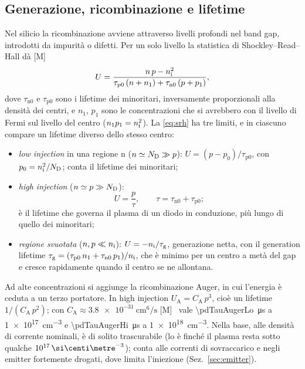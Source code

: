 \documentclass[10pt,a4paper]{scrartcl}
\let\newcommand\pdvaluedefine
\newcommand{\ND}{N_\mathrm{D}}
\newcommand{\nint}{n_\mathrm{i}}
\newcommand{\cmc}{\si{\centi\metre^{-3}}}
\begin{document}
\subsection{Generazione, ricombinazione e lifetime}
\label{sec:lifetime}
Nel silicio la ricombinazione avviene attraverso livelli profondi nel band gap, introdotti da impurità o difetti. Per un solo livello la statistica di Shockley--Read--Hall dà [M]~\cite{sze}
\begin{equation}
U = \frac{n\,p - \nint^2}{\tau_\mathrm{p0}\,(n + n_1) + \tau_\mathrm{n0}\,(p + p_1)} ,
\label{eq:srh}
\end{equation}
dove $\tau_\mathrm{n0}$ e $\tau_\mathrm{p0}$ sono i lifetime dei minoritari, inversamente proporzionali alla densità dei centri, e $n_1$, $p_1$ sono le concentrazioni che si avrebbero con il livello di Fermi sul livello del centro ($n_1 p_1 = \nint^2$). La \eqref{eq:srh} ha tre limiti, e in ciascuno compare un lifetime diverso dello stesso centro:
\begin{itemize}
\item \emph{low injection} in una regione n ($n \simeq \ND \gg p$): $U = (p - p_0)/\tau_\mathrm{p0}$, con $p_0 = \nint^2/\ND$; conta il lifetime dei minoritari;
\item \emph{high injection} ($n \simeq p \gg \ND$):
\begin{equation}
U = \frac{p}{\tau} , \qquad \tau = \tau_\mathrm{n0} + \tau_\mathrm{p0} ;
\label{eq:tauhl}
\end{equation}
è il lifetime che governa il plasma di un diodo in conduzione, più lungo di quello dei minoritari;
\item \emph{regione svuotata} ($n, p \ll \nint$): $U = -\nint/\tau_\mathrm{g}$, generazione netta, con il generation lifetime $\tau_\mathrm{g} = (\tau_\mathrm{p0}\,n_1 + \tau_\mathrm{n0}\,p_1)/\nint$, che è minimo per un centro a metà del gap e cresce rapidamente quando il centro se ne allontana.
\end{itemize}
Ad alte concentrazioni si aggiunge la ricombinazione Auger, in cui l'energia è ceduta a un terzo portatore. In high injection $U_\mathrm{A} = C_\mathrm{A}\,p^3$, cioè un lifetime $1/(C_\mathrm{A}\,p^2)$; con $C_\mathrm{A} \approx \SI{3.8e-31}{\centi\metre^6\per\second}$ [M]~\cite{lutz} vale \SI{\pdTauAugerLo}{\micro\second} a \SI{1e17}{\centi\metre^{-3}} e \SI{\pdTauAugerHi}{\micro\second} a \SI{1e18}{\centi\metre^{-3}}. Nella base, alle densità di corrente nominali, è di solito trascurabile (lo è finché il plasma resta sotto qualche $10^{17}\,\cmc$); conta alle correnti di sovraccarico e negli emitter fortemente drogati, dove limita l'iniezione (Sez.~\ref{sec:emitter}).
\end{document}
